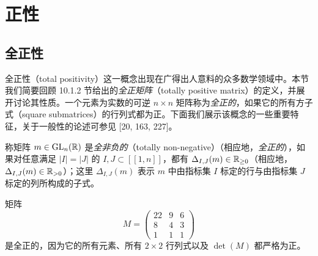 \chapter{正性}


\section{全正性}

全正性（total positivity）这一概念出现在广得出人意料的众多数学领域中。本节我们简要回顾 10.1.2 节给出的\emph{全正矩阵}（totally positive matrix）的定义，并展开讨论其性质。一个元素为实数的可逆 $n\times n$ 矩阵称为\emph{全正的}，如果它的所有方子式（square submatrices）的行列式都为正。下面我们展示该概念的一些重要特征，关于一般性的论述可参见 [20, 163, 227]。

\begin{definition}[12.1]
称矩阵 $m\in\operatorname{GL}_n(\mathbb{R})$ 是\emph{全非负的}（totally non-negative）（相应地，\emph{全正的}），如果对任意满足 $|I|=|J|$ 的 $I,J\subset[\![1,n]\!]$，都有 $\Delta_{I,J}(m)\in\mathbb{R}_{\ge 0}$（相应地，$\Delta_{I,J}(m)\in\mathbb{R}_{>0}$）；这里 $\Delta_{I,J}(m)$ 表示 $m$ 中由指标集 $I$ 标定的行与由指标集 $J$ 标定的列所构成的子式。
\end{definition}

\begin{example}[12.2]
矩阵
\[
M=\begin{pmatrix} 22 & 9 & 6\\ 8 & 4 & 3\\ 1 & 1 & 1\end{pmatrix}
\]
是全正的，因为它的所有元素、所有 $2\times 2$ 行列式以及 $\det(M)$ 都严格为正。
\end{example}

